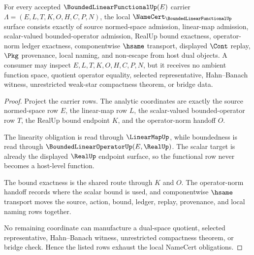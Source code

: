 \begin{theorem}
\label{thm:bounded-linear-functional-namecert-obligations}
For every accepted $\BoundedLinearFunctionalUp(E)$ carrier $\Lambda=(E,L,T,K,O,H,C,P,N)$, the local $\NameCert_{\BoundedLinearFunctionalUp}$ surface consists exactly of source normed-space admission, linear-map admission, scalar-valued bounded-operator admission, RealUp bound exactness, operator-norm ledger exactness, componentwise $\hsame$ transport, displayed $\Cont$ replay, $\Pkg$ provenance, local naming, and non-escape from host dual objects. A consumer may inspect $E,L,T,K,O,H,C,P,N$, but it receives no ambient function space, quotient operator equality, selected representative, Hahn--Banach witness, unrestricted weak-star compactness theorem, or bridge data.
\end{theorem}
\begin{proof}
Project the carrier rows. The analytic coordinates are exactly the source normed-space row $E$, the linear-map row $L$, the scalar-valued bounded-operator row $T$, the RealUp bound endpoint $K$, and the operator-norm handoff $O$.

The linearity obligation is read through $\LinearMapUp$, while boundedness is read through $\BoundedLinearOperatorUp(E,\RealUp)$. The scalar target is already the displayed $\RealUp$ endpoint surface, so the functional row never becomes a host-level function.

The bound exactness is the shared route through $K$ and $O$. The operator-norm handoff records where the scalar bound is used, and componentwise $\hsame$ transport moves the source, action, bound, ledger, replay, provenance, and local naming rows together.

No remaining coordinate can manufacture a dual-space quotient, selected representative, Hahn--Banach witness, unrestricted compactness theorem, or bridge check. Hence the listed rows exhaust the local NameCert obligations.
\end{proof}

